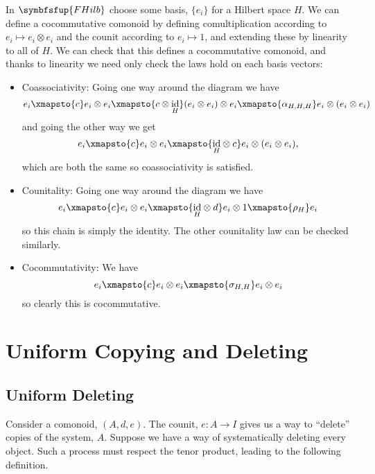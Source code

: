 \documentclass[fleqn]{NotesClass}
\makeatletter
\newcommand{\c@egory}[1]{\symbfsfup{#1}}
\newcommand{\FHilb}{\c@egory{FHilb}}
\DeclareMathOperator{\id}{id}
\makeatother
\begin{document}
    In \(\FHilb\) choose some basis, \(\{e_i\}\) for a Hilbert space \(H\).
    We can define a cocommutative comonoid by defining comultiplication according to \(e_i \mapsto e_i \otimes e_i\) and the counit according to \(e_i \mapsto 1\), and extending these by linearity to all of \(H\).
    We can check that this defines a cocommutative comonoid, and thanks to linearity we need only check the laws hold on each basis vectors:
    \begin{itemize}
        \item Coassociativity: Going one way around the diagram we have
        \begin{equation}
            e_i \xmapsto{c} e_i \otimes e_i \xmapsto{c \otimes \id_H} (e_i \otimes e_i) \otimes e_i \xmapsto{\alpha_{H,H,H}} e_i \otimes (e_i \otimes e_i)
        \end{equation}
        and going the other way we get
        \begin{equation}
            e_i \xmapsto{c} e_i \otimes e_i \xmapsto{{\id_H} \otimes c} e_i \otimes (e_i \otimes e_i),
        \end{equation}
        which are both the same so coassociativity is satisfied.
        \item Counitality: Going one way around the diagram we have
        \begin{equation}
            e_i \xmapsto{c} e_i \otimes e_i \xmapsto{{\id_H} \otimes d} e_i \otimes 1 \xmapsto{\rho_H} e_i
        \end{equation}
        so this chain is simply the identity.
        The other counitality law can be checked similarly.
        \item Cocommutativity: We have
        \begin{equation}
            e_i \xmapsto{c} e_i \otimes e_i \xmapsto{\sigma_{H,H}} e_i \otimes e_i
        \end{equation}
        so clearly this is cocommutative.
    \end{itemize}
    
    \chapter{Uniform Copying and Deleting}
    \section{Uniform Deleting}
    Consider a comonoid, \((A, d, e)\).
    The counit, \(e \colon A \to I\) gives us a way to \enquote{delete} copies of the system, \(A\).
    Suppose we have a way of systematically deleting every object.
    Such a process must respect the tenor product, leading to the following definition.
    
\end{document}
